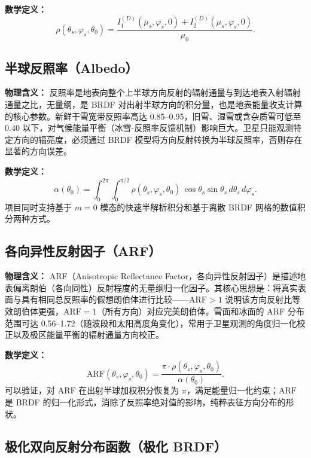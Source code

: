 \documentclass[UTF8,a4paper,12pt]{ctexart}
\begin{document}
\textbf{数学定义：}
\begin{equation}
  \rho(\theta_s,\varphi_s,\theta_0)
  = \frac{I_1^{(D)}(\mu_s,\varphi_s,0)+I_2^{(D)}(\mu_s,\varphi_s,0)}{\mu_0}.
  \label{eq:brdf}
\end{equation}

\subsection{半球反照率（Albedo）}

\textbf{物理含义：}
反照率是地表向整个上半球方向反射的辐射通量与到达地表入射辐射通量之比，无量纲，是 BRDF 对出射半球方向的积分量，也是地表能量收支计算的核心参数。新鲜干雪宽带反照率高达 0.85--0.95，旧雪、湿雪或含杂质雪可低至 0.40 以下，对气候能量平衡（冰雪-反照率反馈机制）影响巨大。卫星只能观测特定方向的辐亮度，必须通过 BRDF 模型将方向反射转换为半球反照率，否则存在显著的方向误差。

\textbf{数学定义：}
\begin{equation}
  \alpha(\theta_0)
  = \int_0^{2\pi}\!\int_0^{\pi/2}\!
    \rho(\theta_s,\varphi_s,\theta_0)\,\cos\theta_s\sin\theta_s\,d\theta_s\,d\varphi_s.
  \label{eq:albedo}
\end{equation}
项目同时支持基于 $m=0$ 模态的快速半解析积分和基于离散 BRDF 网格的数值积分两种方式。

\subsection{各向异性反射因子（ARF）}

\textbf{物理含义：}
ARF（Anisotropic Reflectance Factor，各向异性反射因子）是描述地表偏离朗伯（各向同性）反射程度的无量纲归一化因子。其核心思想是：将真实表面与具有相同总反照率的假想朗伯体进行比较——$\mathrm{ARF}>1$ 说明该方向反射比等效朗伯体更强，$\mathrm{ARF}=1$（所有方向）对应完美朗伯体。雪面和冰面的 ARF 分布范围可达 0.56--1.72（随波段和太阳高度角变化），常用于卫星观测的角度归一化校正以及极区能量平衡的辐射通量方向校正。

\textbf{数学定义：}
\begin{equation}
  \mathrm{ARF}(\theta_s,\varphi_s,\theta_0)
  = \frac{\pi\cdot\rho(\theta_s,\varphi_s,\theta_0)}{\alpha(\theta_0)}.
  \label{eq:arf}
\end{equation}
可以验证，对 $\mathrm{ARF}$ 在出射半球加权积分恢复为 $\pi$，满足能量归一化约束；$\mathrm{ARF}$ 是 BRDF 的归一化形式，消除了反照率绝对值的影响，纯粹表征方向分布的形状。

\subsection{极化双向反射分布函数（极化 BRDF）}
\end{document}
